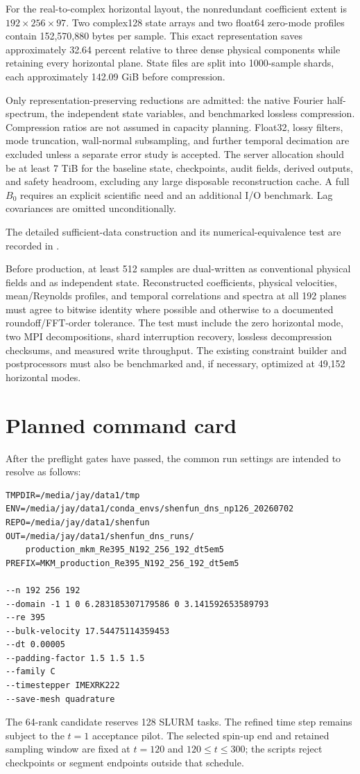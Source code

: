 \documentclass[11pt]{article}
\begin{document}
For the real-to-complex horizontal layout, the nonredundant coefficient extent
is $192\times256\times97$.  Two complex128 state arrays and two float64
zero-mode profiles contain 152,570,880 bytes per sample.  This exact
representation saves approximately 32.64 percent relative to three dense
physical components while retaining every horizontal plane.  State files are
split into 1000-sample shards, each approximately 142.09 GiB before
compression.

Only representation-preserving reductions are admitted: the native Fourier
half-spectrum, the independent state variables, and benchmarked lossless
compression.  Compression ratios are not assumed in capacity planning.
Float32, lossy filters, mode truncation, wall-normal subsampling, and further
temporal decimation are excluded unless a separate error study is accepted.
The server allocation should be at least 7 TiB for the baseline state,
checkpoints, audit fields, derived outputs, and safety headroom, excluding any
large disposable reconstruction cache.  A full $B_0$ requires an explicit
scientific need and an additional I/O benchmark.  Lag covariances are omitted
unconditionally.

The detailed sufficient-data construction and its numerical-equivalence test
are recorded in
.

Before production, at least 512 samples are dual-written as conventional
physical fields and as independent state.  Reconstructed coefficients,
physical velocities, mean/Reynolds profiles, and temporal correlations and
spectra at all 192 planes must agree to bitwise identity where possible and
otherwise to a documented roundoff/FFT-order tolerance.  The test must include
the zero horizontal mode, two MPI decompositions, shard interruption recovery,
lossless decompression checksums, and measured write throughput.  The existing
constraint builder and postprocessors must also be benchmarked and, if
necessary, optimized at 49,152 horizontal modes.

\section{Planned command card}

After the preflight gates have passed, the common run settings are intended to
resolve as follows:
\begin{verbatim}
TMPDIR=/media/jay/data1/tmp
ENV=/media/jay/data1/conda_envs/shenfun_dns_np126_20260702
REPO=/media/jay/data1/shenfun
OUT=/media/jay/data1/shenfun_dns_runs/
    production_mkm_Re395_N192_256_192_dt5em5
PREFIX=MKM_production_Re395_N192_256_192_dt5em5

--n 192 256 192
--domain -1 1 0 6.283185307179586 0 3.141592653589793
--re 395
--bulk-velocity 17.54475114359453
--dt 0.00005
--padding-factor 1.5 1.5 1.5
--family C
--timestepper IMEXRK222
--save-mesh quadrature
\end{verbatim}
The 64-rank candidate reserves 128 SLURM tasks.  The refined time step remains
subject to the $t=1$ acceptance pilot.  The selected spin-up end and retained
sampling window are fixed at $t=120$ and $120\le t\le300$; the scripts reject
checkpoints or segment endpoints outside that schedule.
\end{document}
